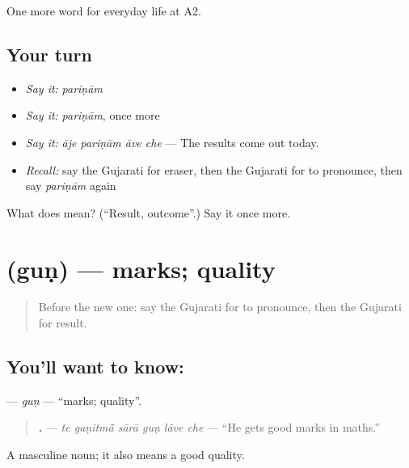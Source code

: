 \begin{grammarlens}[title={What you've built}]
One more word for everyday life at A2.
\end{grammarlens}

\subsection*{Your turn}
\begin{itemize}
\raggedright
  \item \emph{Say it:} \emph{pariṇām}
  \item \emph{Say it:} \emph{pariṇām}, once more
  \item \emph{Say it:} \emph{āje pariṇām āve che} — The results come out today.
  \item \emph{Recall:} say the Gujarati for eraser, then the Gujarati for to pronounce, then say \emph{pariṇām} again
\end{itemize}

\begin{tcolorbox}[breakable,colback=teal!4,colframe=teal!35!black,title={Before you move on}]
What does  mean? (\textquotedblleft{}Result, outcome\textquotedblright{}.) Say it once more.
\end{tcolorbox}
\section[\texorpdfstring{\gu{ગુણ} (guṇ)}{ગુણ (guṇ)}]{ (guṇ) — marks; quality}

\label{lesson:GU-C246-gun}



\begin{quote}
Before the new one: say the Gujarati for to pronounce, then the Gujarati for result.
\end{quote}

\subsection*{You'll want to know: }
\textbf{} — \emph{guṇ} — \textquotedblleft{}marks; quality\textquotedblright{}.

\begin{quote}
\textbf{     .} — \emph{te gaṇitmā̃ sārā guṇ lāve che} — \textquotedblleft{}He gets good marks in maths.\textquotedblright{}
\end{quote}

A masculine noun; it also means a good quality.

